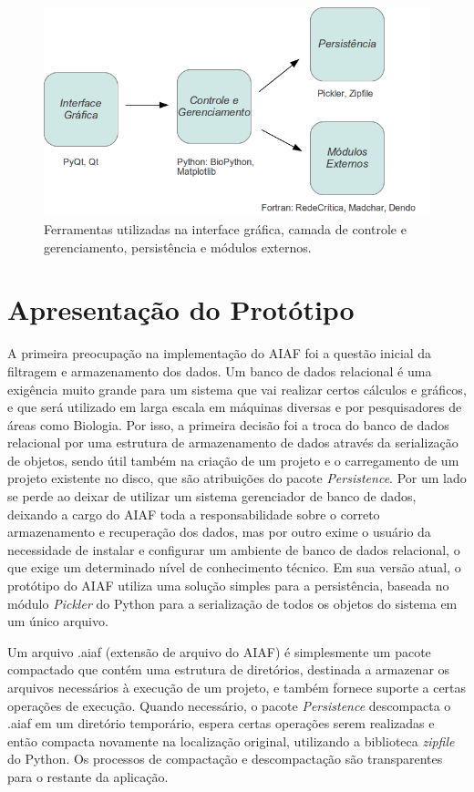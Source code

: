 \begin{figure}
\centering
\includegraphics[scale=0.43]{ferramentas-camadas}
\caption{Ferramentas utilizadas na interface gráfica, camada de controle e gerenciamento, persistência e módulos externos.}
\label{fig:ferramentas-camadas}
\end{figure}

\section{Apresentação do Protótipo} \label{sec:discussao}

A primeira preocupação na implementação do AIAF foi a questão inicial da filtragem e armazenamento dos dados. Um banco de dados relacional é uma exigência
muito grande para um sistema que vai realizar certos cálculos e gráficos, e que será utilizado em larga escala em máquinas diversas e por pesquisadores de
áreas como Biologia. Por isso, a primeira decisão foi a troca do banco de dados relacional por uma estrutura de armazenamento de dados através da serialização
de objetos, sendo útil também na criação de um projeto e o carregamento de um projeto existente no disco, que são atribuições do pacote 
\textit{Persistence}. Por um lado se perde ao deixar de utilizar um sistema gerenciador de banco de dados, deixando a cargo do AIAF toda a responsabilidade
sobre o correto armazenamento e recuperação dos dados, mas por outro exime o usuário da necessidade de instalar e configurar um ambiente de banco de dados
relacional, o que exige um determinado nível de conhecimento técnico. Em sua versão atual, o protótipo do AIAF utiliza uma solução simples para a persistência,
baseada no módulo \textit{Pickler} do
Python para a serialização de todos os objetos do sistema em um único arquivo.


Um arquivo .aiaf (extensão de arquivo do AIAF) é simplesmente um pacote compactado que contém uma estrutura de diretórios, destinada a armazenar os arquivos
necessários à execução de um projeto, e também fornece suporte a certas operações de execução. Quando necessário, o pacote \textit{Persistence} descompacta
o .aiaf em um diretório temporário, espera certas operações serem realizadas e então compacta novamente na localização original, utilizando a biblioteca
\textit{zipfile} do Python. Os processos de compactação e descompactação são transparentes para o restante da aplicação.

